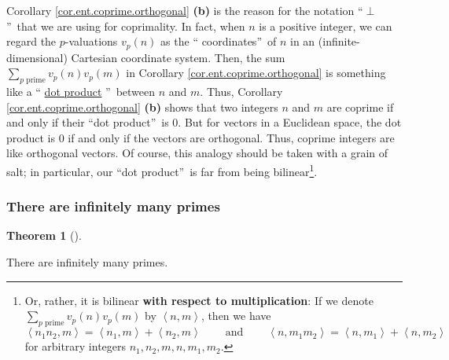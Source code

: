 \documentclass[numbers=enddot,12pt,final,onecolumn,notitlepage]{scrartcl}%
\numberwithin{exer}{subsection}
\theoremstyle{definition}
\newtheorem{theo}{Theorem}[subsection]
\newenvironment{theorem}[1][]
{\begin{theo}[#1]\begin{leftbar}}
{\end{leftbar}\end{theo}}
\let\sumnonlimits\sum
\renewcommand{\sum}{\sumnonlimits\limits}
\begin{document}
Corollary \ref{cor.ent.coprime.orthogonal} \textbf{(b)} is the reason for the
notation \textquotedblleft$\perp$\textquotedblright\ that we are using for
coprimality. In fact, when $n$ is a positive integer, we can regard the
$p$-valuations $v_{p}\left(  n\right)  $ as the \textquotedblleft
coordinates\textquotedblright\ of $n$ in an (infinite-dimensional) Cartesian
coordinate system. Then, the sum $\sum_{p\text{ prime}}v_{p}\left(  n\right)
v_{p}\left(  m\right)  $ in Corollary \ref{cor.ent.coprime.orthogonal} is
something like a \textquotedblleft%
\href{https://en.wikipedia.org/wiki/Dot_product}{dot product}%
\textquotedblright\ between $n$ and $m$. Thus, Corollary
\ref{cor.ent.coprime.orthogonal} \textbf{(b)} shows that two integers $n$ and
$m$ are coprime if and only if their \textquotedblleft dot
product\textquotedblright\ is $0$. But for vectors in a Euclidean space, the
dot product is $0$ if and only if the vectors are orthogonal. Thus, coprime
integers are like orthogonal vectors. Of course, this analogy should be taken
with a grain of salt; in particular, our \textquotedblleft dot
product\textquotedblright\ is far from being bilinear\footnote{Or, rather, it
is bilinear \textbf{with respect to multiplication}: If we denote
$\sum_{p\text{ prime}}v_{p}\left(  n\right)  v_{p}\left(  m\right)  $ by
$\left\langle n,m\right\rangle $, then we have%
\[
\left\langle n_{1}n_{2},m\right\rangle =\left\langle n_{1},m\right\rangle
+\left\langle n_{2},m\right\rangle \ \ \ \ \ \ \ \ \ \ \text{and}%
\ \ \ \ \ \ \ \ \ \ \left\langle n,m_{1}m_{2}\right\rangle =\left\langle
n,m_{1}\right\rangle +\left\langle n,m_{2}\right\rangle
\]
for arbitrary integers $n_{1},n_{2},m,n,m_{1},m_{2}$.}.

\subsubsection{There are infinitely many primes}

\begin{theorem}
\label{thm.ent.primes.infin}There are infinitely many primes.
\end{theorem}
\end{document}
